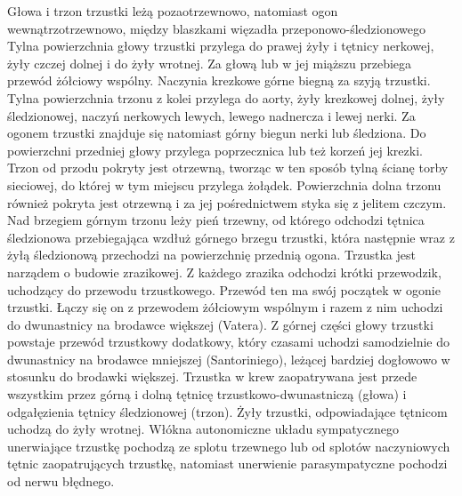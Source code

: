 \documentclass[a4paper, 12pt]{report}
\begin{document}
Głowa i trzon trzustki leżą pozaotrzewnowo, natomiast ogon
wewnątrzotrzewnowo, między blaszkami więzadła
przeponowo-śledzionowego
Tylna powierzchnia głowy trzustki przylega do prawej żyły i tętnicy
nerkowej, żyły czczej dolnej i do żyły wrotnej. Za głową lub w jej
miąższu przebiega przewód żółciowy wspólny. Naczynia krezkowe górne
biegną za szyją trzustki. Tylna powierzchnia trzonu z kolei przylega
do aorty, żyły krezkowej dolnej, żyły śledzionowej, naczyń nerkowych
lewych, lewego nadnercza i lewej nerki. Za ogonem trzustki znajduje
się natomiast górny biegun nerki lub śledziona. Do powierzchni
przedniej głowy przylega poprzecznica lub też korzeń jej krezki. Trzon
od przodu pokryty jest otrzewną, tworząc w ten sposób tylną ścianę
torby sieciowej, do której w tym miejscu przylega
żołądek. Powierzchnia dolna trzonu również pokryta jest otrzewną i za
jej pośrednictwem styka się z jelitem czczym. Nad brzegiem górnym
trzonu leży pień trzewny, od którego odchodzi tętnica śledzionowa
przebiegająca wzdłuż górnego brzegu trzustki, która następnie
wraz z żyłą śledzionową przechodzi na powierzchnię przednią ogona.
Trzustka jest narządem o budowie zrazikowej. Z każdego zrazika
odchodzi krótki przewodzik, uchodzący do przewodu
trzustkowego. Przewód ten ma swój początek w ogonie trzustki. Łączy
się on z przewodem żółciowym wspólnym i razem z nim uchodzi do
dwunastnicy na brodawce większej (Vatera). Z górnej części głowy trzustki
powstaje przewód trzustkowy dodatkowy, który czasami uchodzi
samodzielnie do dwunastnicy na brodawce mniejszej (Santoriniego), leżącej bardziej
dogłowowo w stosunku do brodawki większej.  Trzustka w krew
zaopatrywana jest przede wszystkim przez górną i dolną tętnicę trzustkowo-dwunastniczą
(głowa) i odgałęzienia tętnicy śledzionowej (trzon). Żyły trzustki,
odpowiadające tętnicom uchodzą do żyły wrotnej. Włókna autonomiczne
układu sympatycznego unerwiające trzustkę pochodzą ze splotu trzewnego lub od splotów
naczyniowych tętnic zaopatrujących trzustkę, natomiast unerwienie
parasympatyczne pochodzi od nerwu błędnego.
\end{document}
